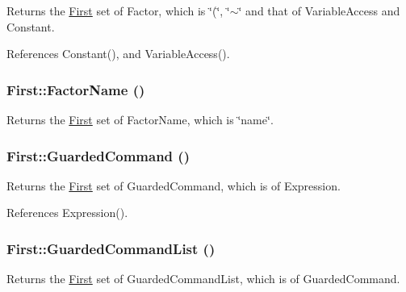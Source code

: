 Returns the \hyperlink{classFirst}{First} set of Factor, which is \char`\"{}(\char`\"{}, \char`\"{}$\sim$\char`\"{} and that of VariableAccess and Constant. 



References Constant(), and VariableAccess().

\hypertarget{classFirst_a7cad21c19a5bee92d6721497c1182d89}{
\subsubsection[{FactorName}]{ First::FactorName ()}}
\label{classFirst_a7cad21c19a5bee92d6721497c1182d89}


Returns the \hyperlink{classFirst}{First} set of FactorName, which is \char`\"{}name\char`\"{}. 

\hypertarget{classFirst_aab66c404b95b67ab14b31bfeaa400eb0}{
\subsubsection[{GuardedCommand}]{ First::GuardedCommand ()}}
\label{classFirst_aab66c404b95b67ab14b31bfeaa400eb0}


Returns the \hyperlink{classFirst}{First} set of GuardedCommand, which is of Expression. 



References Expression().

\hypertarget{classFirst_a1ab37b8f1947f33138b6a880e0731f5f}{
\subsubsection[{GuardedCommandList}]{ First::GuardedCommandList ()}}
\label{classFirst_a1ab37b8f1947f33138b6a880e0731f5f}


Returns the \hyperlink{classFirst}{First} set of GuardedCommandList, which is of GuardedCommand. 



